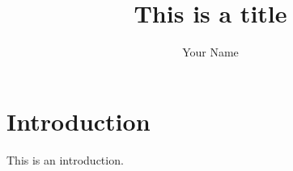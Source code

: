 \documentclass[10pt,journal,cspaper,compsoc]{IEEEtran}<%
\begin{document}
\title{This is a title}
\author{Your Name}

\maketitle

\section{Introduction}
This is an introduction.
\end{document}
